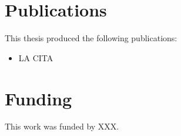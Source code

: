 
\chapter{Publications}
This thesis produced the following publications:
\begin{itemize}

    \item[]\MakeUppercase{ la cita}
\end{itemize}
\clearpage
\chapter{Funding}
{\noindent This work was funded by XXX.}

